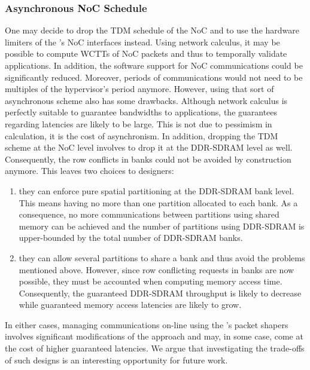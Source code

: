 \documentclass[main.tex]{subfiles}
\begin{document}
\subsubsection{Asynchronous NoC Schedule}
One may decide to drop the TDM schedule of the NoC and to use the hardware limiters of the \mppalong's NoC interfaces instead. Using network calculus, it may be possible to compute WCTTs of NoC packets and thus to temporally validate applications. In addition, the software support for NoC communications could be significantly reduced. Moreover, periods of communications would not need to be multiples of the hypervisor's period anymore. However, using that sort of asynchronous scheme also has some drawbacks. Although network calculus is perfectly suitable to guarantee bandwidths to applications, the guarantees regarding latencies are likely to be large. This is not due to pessimism in calculation, it is the cost of asynchronism. In addition, dropping the TDM scheme at the NoC level involves to drop it at the DDR-SDRAM level as well. Consequently, the row conflicts in banks could not be avoided by construction anymore. This leaves two choices to designers:
\begin{enumerate}
    \item they can enforce pure spatial partitioning at the DDR-SDRAM bank level. This means having no more than one partition allocated to each bank. As a consequence, no more communications between partitions using shared memory can be achieved and the number of partitions using DDR-SDRAM is upper-bounded by the total number of DDR-SDRAM banks.
    \item they can allow several partitions to share a bank and thus avoid the problems mentioned above. However, since row conflicting requests in banks are now possible, they must be accounted when computing memory access time. Consequently, the guaranteed DDR-SDRAM throughput is likely to decrease while guaranteed memory access latencies are likely to grow.
\end{enumerate}
In either cases, managing communications on-line using the \mppalong's packet shapers involves significant modifications of the approach and may, in some case, come at the cost of higher guaranteed latencies. We argue that investigating the trade-offs of such designs is an interesting opportunity for future work.
\end{document}
